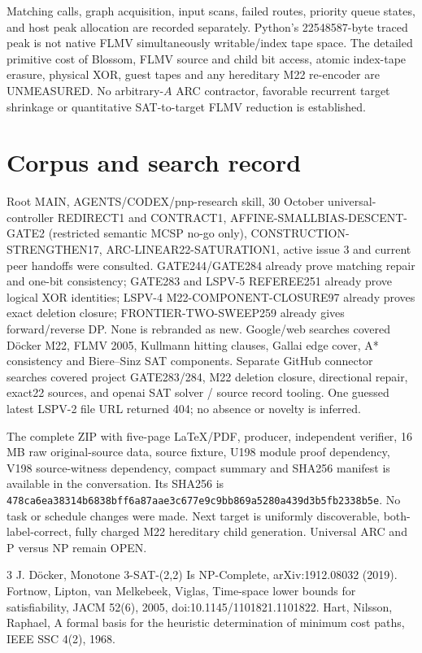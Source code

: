 \documentclass[11pt]{article}
\begin{document}
Matching calls, graph acquisition, input scans, failed routes, priority queue states, and host peak allocation are recorded separately. Python's 22548587-byte traced peak is not native FLMV simultaneously writable/index tape space. The detailed primitive cost of Blossom, FLMV source and child bit access, atomic index-tape erasure, physical XOR, guest tapes and any hereditary M22 re-encoder are UNMEASURED. No arbitrary-$A$ ARC contractor, favorable recurrent target shrinkage or quantitative SAT-to-target FLMV reduction is established.

\section{Corpus and search record}
Root MAIN, AGENTS/CODEX/pnp-research skill, 30 October universal-controller REDIRECT1 and CONTRACT1, AFFINE-SMALLBIAS-DESCENT-GATE2 (restricted semantic MCSP no-go only), CONSTRUCTION-STRENGTHEN17, ARC-LINEAR22-SATURATION1, active issue 3 and current peer handoffs were consulted. GATE244/GATE284 already prove matching repair and one-bit consistency; GATE283 and LSPV-5 REFEREE251 already prove logical XOR identities; LSPV-4 M22-COMPONENT-CLOSURE97 already proves exact deletion closure; FRONTIER-TWO-SWEEP259 already gives forward/reverse DP. None is rebranded as new. Google/web searches covered D\"ocker M22, FLMV 2005, Kullmann hitting clauses, Gallai edge cover, A* consistency and Biere--Sinz SAT components. Separate GitHub connector searches covered project GATE283/284, M22 deletion closure, directional repair, exact22 sources, and openai SAT solver / source record tooling. One guessed latest LSPV-2 file URL returned 404; no absence or novelty is inferred.

The complete ZIP with five-page LaTeX/PDF, producer, independent verifier, 16 MB raw original-source data, source fixture, U198 module proof dependency, V198 source-witness dependency, compact summary and SHA256 manifest is available in the conversation. Its SHA256 is \texttt{478ca6ea38314b6838bff6a87aae3c677e9c9bb869a5280a439d3b5fb2338b5e}. No task or schedule changes were made. Next target is uniformly discoverable, both-label-correct, fully charged M22 hereditary child generation. Universal ARC and P versus NP remain OPEN.
\begin{thebibliography}{3}
 J. D\"ocker, Monotone 3-SAT-(2,2) Is NP-Complete, arXiv:1912.08032 (2019).
 Fortnow, Lipton, van Melkebeek, Viglas, Time-space lower bounds for satisfiability, JACM 52(6), 2005, doi:10.1145/1101821.1101822.
 Hart, Nilsson, Raphael, A formal basis for the heuristic determination of minimum cost paths, IEEE SSC 4(2), 1968.
\end{thebibliography}
\end{document}
